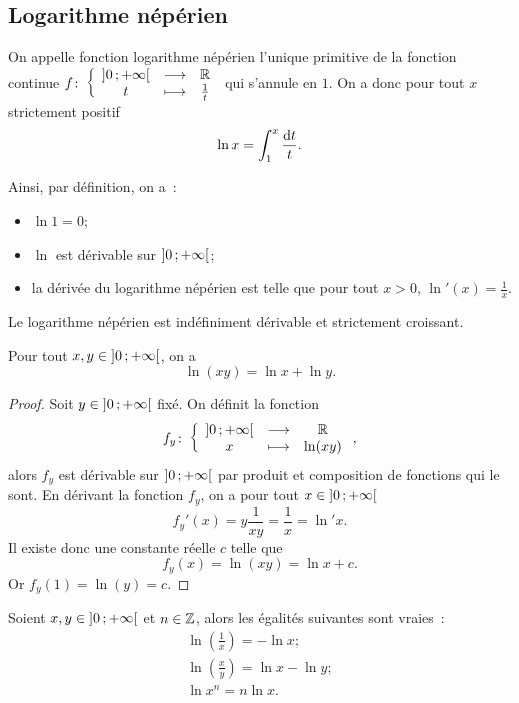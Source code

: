 \subsection{Logarithme népérien}
\label{subsec:chap1-lognep}
%
\begin{defdef}
\label{def:chap1-deflognep}
On appelle fonction logarithme népérien l'unique primitive de la fonction continue $f\colon \left\{\begin{array}{ccc} \left] 0 \, ;  +\infty \right[ & \longrightarrow &\mathbb{R}\\ t & \longmapsto & \frac{1}{t} \end{array} \right.$ qui s'annule en $1$. On a donc pour tout $x$ strictement positif
\begin{equation}
  \ln x=\int_{1}^{x} \frac{\mathop{}\mathopen{}\mathrm{d} t}{t}.
\end{equation}
\end{defdef}
%
Ainsi, par définition, on a~:
\begin{itemize}
\item $\ln 1 = 0$;
\item $\ln$ est dérivable sur $\left] 0 \, ;  +\infty \right[$;
\item la dérivée du logarithme népérien est telle que pour tout $x>0$, $\ln'(x)=\frac{1}{x}$.
\end{itemize}
Le logarithme népérien est indéfiniment dérivable et strictement croissant.
%
\begin{theo}
\label{theo:lognep1}
  Pour tout $x, y \in \left] 0 \, ;  +\infty \right[$, on a
  \begin{equation}
    \ln(xy)=\ln x + \ln y.
  \end{equation}
\end{theo}
\begin{proof}
  Soit $y \in \left] 0 \, ;  +\infty \right[$ fixé. On définit la fonction
  \begin{equation}
    f_y\colon \left\{\begin{array}{ccc} \left] 0 \, ;  +\infty \right[ & \longrightarrow &\mathbb{R}\\ x & \longmapsto & \ln(xy) \end{array} \right.,
  \end{equation}
  alors $f_y$ est dérivable sur $\left] 0 \, ;  +\infty \right[$ par produit et composition de fonctions qui le sont. En dérivant la fonction $f_y$, on a pour tout $x \in \left] 0 \, ;  +\infty \right[$
   \begin{equation}
     f_y'(x)=y \frac{1}{xy}=\frac{1}{x}=\ln' x.
   \end{equation}
  Il existe donc une constante réelle $c$ telle que
  \begin{equation}
    f_y(x)=\ln(xy)=\ln x + c.
  \end{equation}
  Or $f_y(1)=\ln(y)=c$.
\end{proof}
%
\begin{prop}
  Soient $x, y \in \left] 0 \, ;  +\infty \right[$ et $n \in \mathbb{Z}$, alors les égalités suivantes sont vraies~:
  \begin{gather}
    \ln \left(\frac{1}{x}\right)=-\ln x;\\
    \ln \left(\frac{x}{y}\right)=\ln x - \ln y; \\
    \ln x^n=n\ln x.
  \end{gather}
\end{prop}
